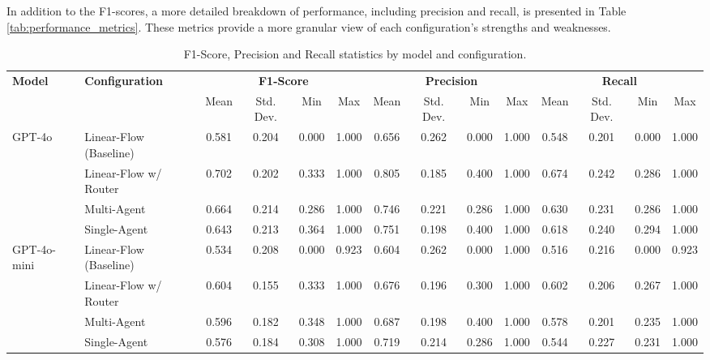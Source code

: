         In addition to the F1-scores, a more detailed breakdown of performance, including precision and recall, is presented in Table \ref{tab:performance_metrics}. These metrics provide a more granular view of each configuration's strengths and weaknesses.

        \begin{landscape}
            \begin{table}[H]
            \centering
            \caption{F1-Score, Precision and Recall statistics by model and configuration.}
            \label{tab:stats_by_model_config}
            \begin{tabular}{@{}llcccccccccccc@{}}
                \toprule
                \multirow{2}{*}{\textbf{Model}} & \multirow{2}{*}{\textbf{Configuration}} & \multicolumn{4}{c}{\textbf{F1-Score}} & \multicolumn{4}{c}{\textbf{Precision}} & \multicolumn{4}{c}{\textbf{Recall}} \\
                \cmidrule(l){3-6} \cmidrule(l){7-10} \cmidrule(l){11-14}
                & & Mean & Std. Dev. & Min & Max & Mean & Std. Dev. & Min & Max & Mean & Std. Dev. & Min & Max \\
                \midrule
                \multirow{4}{*}{GPT-4o} & Linear-Flow (Baseline) & 0.581 & 0.204 & 0.000 & 1.000 & 0.656 & 0.262 & 0.000 & 1.000 & 0.548 & 0.201 & 0.000 & 1.000 \\
                & Linear-Flow w/ Router & 0.702 & 0.202 & 0.333 & 1.000 & 0.805 & 0.185 & 0.400 & 1.000 & 0.674 & 0.242 & 0.286 & 1.000 \\
                & Multi-Agent & 0.664 & 0.214 & 0.286 & 1.000 & 0.746 & 0.221 & 0.286 & 1.000 & 0.630 & 0.231 & 0.286 & 1.000 \\
                & Single-Agent & 0.643 & 0.213 & 0.364 & 1.000 & 0.751 & 0.198 & 0.400 & 1.000 & 0.618 & 0.240 & 0.294 & 1.000 \\
                \midrule
                \multirow{4}{*}{GPT-4o-mini} & Linear-Flow (Baseline) & 0.534 & 0.208 & 0.000 & 0.923 & 0.604 & 0.262 & 0.000 & 1.000 & 0.516 & 0.216 & 0.000 & 0.923 \\
                & Linear-Flow w/ Router & 0.604 & 0.155 & 0.333 & 1.000 & 0.676 & 0.196 & 0.300 & 1.000 & 0.602 & 0.206 & 0.267 & 1.000 \\
                & Multi-Agent & 0.596 & 0.182 & 0.348 & 1.000 & 0.687 & 0.198 & 0.400 & 1.000 & 0.578 & 0.201 & 0.235 & 1.000 \\
                & Single-Agent & 0.576 & 0.184 & 0.308 & 1.000 & 0.719 & 0.214 & 0.286 & 1.000 & 0.544 & 0.227 & 0.231 & 1.000 \\
                \bottomrule
            \end{tabular}%
            \end{table}

        \end{landscape}













